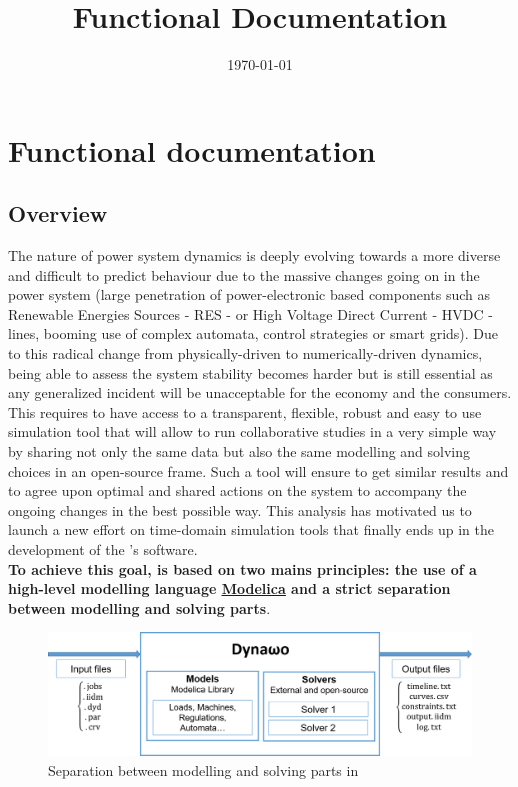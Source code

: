 \documentclass[a4paper, 12pt]{report}
\begin{document}
\title{\Dynawo Functional Documentation}
\date\today

\maketitle
\tableofcontents

\chapter{Functional documentation}

\section{\Dynawo Overview}

The nature of power system dynamics is deeply evolving towards a more diverse and difficult to predict behaviour due to the massive changes going on in the power system (large penetration of power-electronic based components such as Renewable Energies Sources - RES - or High Voltage Direct Current - HVDC - lines, booming use of complex automata, control strategies or smart grids). Due to this radical change from physically-driven to numerically-driven dynamics, being able to assess the system stability becomes harder but is still essential as any generalized incident will be unacceptable for the economy and the consumers. This requires to have access to a transparent, flexible, robust and easy to use simulation tool that will allow to run collaborative studies in a very simple way by sharing not only the same data but also the same modelling and solving choices in an open-source frame. Such a tool will ensure to get similar results and to agree upon optimal and shared actions on the system to accompany the ongoing changes in the best possible way. This analysis has motivated us to launch a new effort on time-domain simulation tools that finally ends up in the development of the \Dynawo's software. \\

\textbf{To achieve this goal, \Dynawo is based on two mains principles: the use of a high-level modelling language \href{https://modelica.org/} {\underline{Modelica}} and a strict separation between modelling and solving parts}.\\

\begin{figure}[h!]
\centering
\includegraphics[width=\textwidth]{../resources/DynawoModelSolver.png}
\caption{Separation between modelling and solving parts in \Dynawo}
\end{figure}
\end{document}
